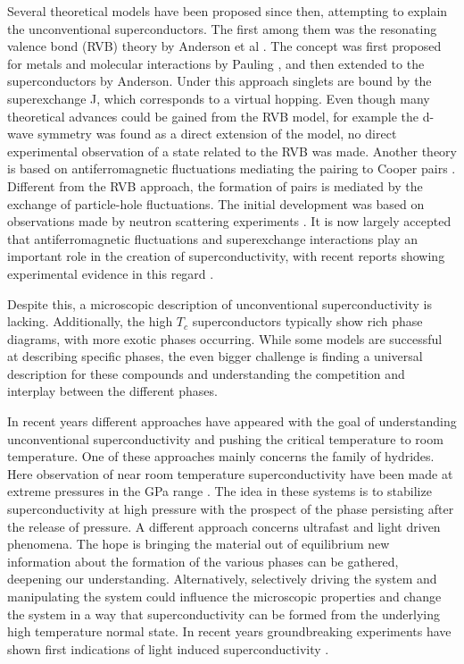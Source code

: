 Several theoretical models have been proposed since then, attempting to explain the unconventional superconductors.
The first among them was the resonating valence bond (RVB) theory by Anderson et al \cite{anderson_resonating_1973,anderson_resonating--valence-bond_1987}.
The concept was first proposed for metals and molecular interactions by Pauling \cite{pauling_nature_1938, pauling_nature_1948}, and then extended to the superconductors by Anderson.
Under this approach singlets are bound by the superexchange J, which corresponds to a virtual hopping.
Even though many theoretical advances could be gained from the RVB model, for example the d-wave symmetry was found as a direct extension of the model, no direct experimental observation of a state related to the RVB was made.
Another theory is based on antiferromagnetic fluctuations mediating the pairing to Cooper pairs \cite{bickers_cdw_1987}.
Different from the RVB approach, the formation of pairs is mediated by the exchange of particle-hole fluctuations.
The initial development was based on observations made by neutron scattering experiments \cite{mook_polarized_1993,hayden_structure_2004,dahm_strength_2009}.
It is now largely accepted that antiferromagnetic fluctuations and superexchange interactions play an important role in the creation of superconductivity, with recent reports showing experimental evidence in this regard \cite{kowalski_oxygen_2021,omahony_electron_2022}.

Despite this, a microscopic description of unconventional superconductivity is lacking.
Additionally, the high $T_c$ superconductors typically show rich phase diagrams, with more exotic phases occurring.
While some models are successful at describing specific phases, the even bigger challenge is finding a universal description for these compounds and understanding the competition and interplay between the different phases.

In recent years different approaches have appeared with the goal of understanding unconventional superconductivity and pushing the critical temperature to room temperature.
One of these approaches mainly concerns the family of hydrides.
Here observation of near room temperature superconductivity have been made at extreme pressures in the \unit{\giga\pascal} range \cite{duan_structure_2017}.
The idea in these systems is to stabilize superconductivity at high pressure with the prospect of the phase persisting after the release of pressure.
A different approach concerns ultrafast and light driven phenomena.
The hope is bringing the material out of equilibrium new information about the formation of the various phases can be gathered, deepening our understanding.
Alternatively, selectively driving the system and manipulating the system could influence the microscopic properties and change the system in a way that superconductivity can be formed from the underlying high temperature normal state.
In recent years groundbreaking experiments have shown first indications of light induced superconductivity \cite{fausti_light-induced_2011,buzzi_phase_2021,fava_magnetic_2024}.

